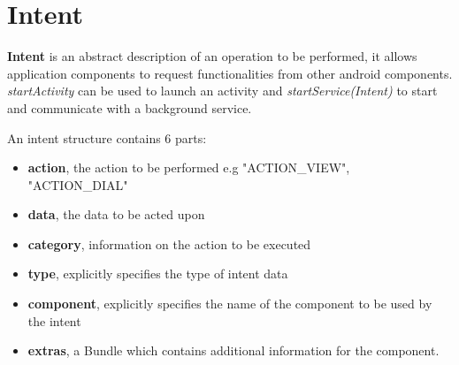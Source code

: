 \section{Intent}
{\bf Intent} is an abstract description of an operation to be performed, it allows application components to request functionalities from other android components. {\it startActivity} can be used to launch an activity and {\it startService(Intent)} to start and communicate with a background service.

An intent structure contains 6 parts:
\begin{itemize}
\item {\bf action}, the action to be performed e.g "ACTION\_VIEW", "ACTION\_DIAL"
\item {\bf data}, the data to be acted upon
\item {\bf category}, information on the action to be executed
\item {\bf type}, explicitly specifies the type of intent data
\item {\bf component}, explicitly specifies the name of the component to be used by the intent
\item {\bf extras}, a Bundle which contains additional information for the component.
\end{itemize}
